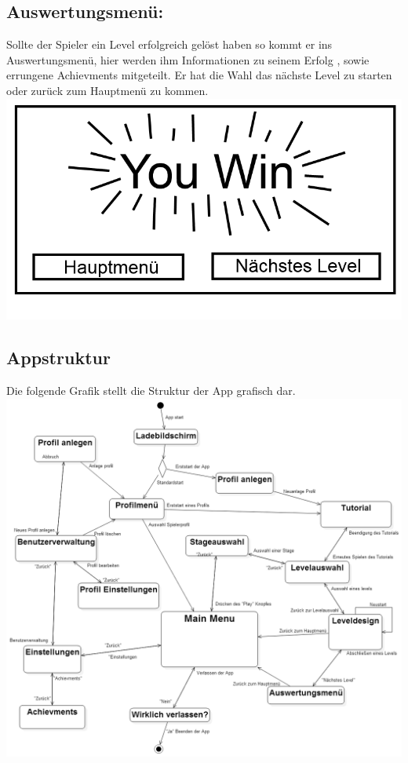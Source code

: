 \documentclass{scrartcl}
\begin{document}
\begin{enumerate}
	\begin{minipage}{1\textwidth}
		\item \subsection*{Auswertungsmenü:}
		Sollte der Spieler ein Level erfolgreich gelöst haben so kommt er ins Auswertungsmenü, hier werden ihm Informationen zu seinem Erfolg , sowie errungene Achievments mitgeteilt. Er hat die Wahl das nächste Level zu starten oder zurück zum Hauptmenü zu kommen. 
		\includegraphics[scale=0.5]{assets/Auswertungsmenu}
	\end{minipage}

\end{enumerate}

\clearpage

\begin{minipage}{1\textwidth}
\subsection{Appstruktur}
	Die folgende Grafik stellt die Struktur der App grafisch dar.\\
	\includegraphics[width=\textwidth]{assets/Menustructur}
\end{minipage}
\end{document}
